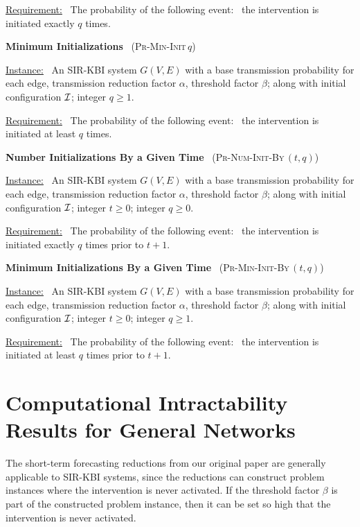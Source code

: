\documentclass[11pt]{article}
\newcommand{\cali}{\mbox{${\cal I}$}}
\newcommand{\MinInits}{\mbox{\textsc{Pr-Min-Init}$\,q$}}
\newcommand{\NumInitsBy}{\mbox{\textsc{Pr-Num-Init-By}$\,(t,q)$}}
\newcommand{\MinInitsBy}{\mbox{\textsc{Pr-Min-Init-By}$\,(t,q)$}}
\begin{document}
\smallskip
\noindent
\underline{Requirement:}~ The probability of the following
event:~ the intervention is initiated exactly $q$ times.


\bigskip
\noindent
\textbf{Minimum Initializations}~ (\MinInits)

\medskip
\noindent
\underline{Instance:}~ An SIR-KBI system $G(V,E)$ with a base transmission probability for each edge,
transmission reduction factor $\alpha$, threshold factor $\beta$;
along with initial configuration \cali; integer $q \geq 1$.

\smallskip
\noindent
\underline{Requirement:}~ The probability of the following
event:~ the intervention is initiated at least $q$ times.


\bigskip
\noindent
\textbf{Number Initializations By a Given Time}~ (\NumInitsBy)

\medskip
\noindent
\underline{Instance:}~ An SIR-KBI system $G(V,E)$ with a base transmission probability for each edge,
transmission reduction factor $\alpha$, threshold factor $\beta$;
along with initial configuration \cali; integer $t \geq 0$; integer $q \geq 0$.

\smallskip
\noindent
\underline{Requirement:}~ The probability of the following
event:~ the intervention is initiated exactly $q$ times prior to $t+1$.


\bigskip
\noindent
\textbf{Minimum Initializations By a Given Time}~ (\MinInitsBy)

\medskip
\noindent
\underline{Instance:}~ An SIR-KBI system $G(V,E)$ with a base transmission probability for each edge,
transmission reduction factor $\alpha$, threshold factor $\beta$;
along with initial configuration \cali; integer $t \geq 0$; integer $q \geq 1$.

\smallskip
\noindent
\underline{Requirement:}~ The probability of the following
event:~ the intervention is initiated at least $q$ times prior to $t+1$.









\bigskip

\section{Computational Intractability Results for General Networks}
\label{sec:general_results}

The short-term forecasting reductions from our original paper 
are generally applicable to SIR-KBI systems,
since the reductions can construct problem instances where the intervention is never activated.
If the threshold factor $\beta$ is part of the constructed problem instance,
then it can be set so high that the intervention is never activated.
\end{document}
